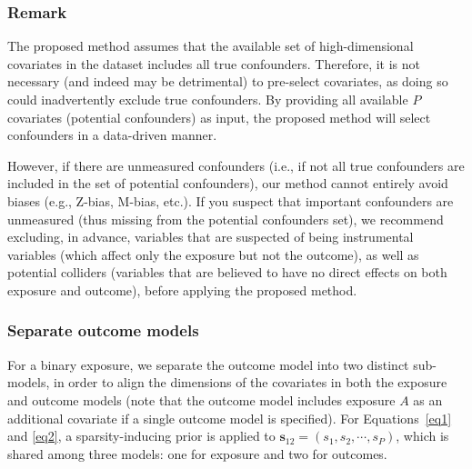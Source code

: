 \subsubsection{Remark}
The proposed method assumes that the available set of high-dimensional covariates in the dataset includes all true confounders. Therefore, it is not necessary (and indeed may be detrimental) to pre-select covariates, as doing so could inadvertently exclude true confounders. By providing all available $P$ covariates (potential confounders) as input, the proposed method will select confounders in a data-driven manner.

However, if there are unmeasured confounders (i.e., if not all true confounders are included in the set of potential confounders), our method cannot entirely avoid biases (e.g., Z-bias, M-bias, etc.). If you suspect that important confounders are unmeasured (thus missing from the potential confounders set), we recommend excluding, in advance, variables that are suspected of being instrumental variables (which affect only the exposure but not the outcome), as well as potential colliders (variables that are believed to have no direct effects on both exposure and outcome), before applying the proposed method.



\subsubsection{Separate outcome models}
For a binary exposure, we separate the outcome model into two distinct sub-models, in order to align the dimensions of the covariates in both the exposure and outcome models (note that the outcome model includes exposure $A$ as an additional covariate if a single outcome model is specified). For Equations~\ref{eq1} and \ref{eq2}, a sparsity-inducing prior is applied to $\boldsymbol{s}_{12} = (s_1, s_2, \cdots, s_P)$, which is shared among three models: one for exposure and two for outcomes. %

